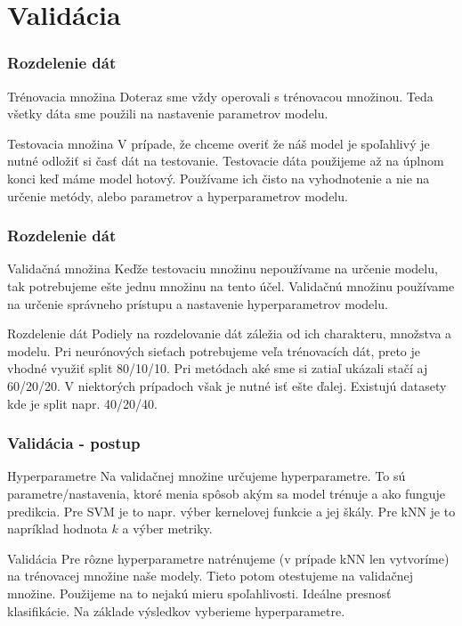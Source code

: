 \documentclass{beamer}
\begin{document}
\section{Validácia}
\begin{frame}
\frametitle{Rozdelenie dát}
\begin{block}{Trénovacia množina}
Doteraz sme vždy operovali s trénovacou množinou. Teda všetky dáta sme použili na nastavenie parametrov modelu.
\end{block}

\begin{block}{Testovacia množina}
V prípade, že chceme overiť že náš model je spoľahlivý je nutné odložiť si časť dát na testovanie. Testovacie dáta použijeme až na úplnom konci keď máme model hotový. Používame ich čisto na vyhodnotenie a nie na určenie metódy, alebo parametrov a hyperparametrov modelu.
\end{block}
\end{frame}


\begin{frame}
\frametitle{Rozdelenie dát}
\begin{block}{Validačná množina}
Keďže testovaciu množinu nepoužívame na určenie modelu, tak potrebujeme ešte jednu množinu na tento účel. Validačnú množinu používame na určenie správneho prístupu a nastavenie hyperparametrov modelu. 
\end{block}

\begin{block}{Rozdelenie dát}
Podiely na rozdelovanie dát záležia od ich charakteru, množstva a modelu. Pri neurónových sieťach potrebujeme veľa trénovacích dát, preto je vhodné využiť split 80/10/10. Pri metódach aké sme si zatiaľ ukázali stačí aj 60/20/20. V niektorých prípadoch však je nutné isť ešte ďalej. Existujú datasety kde je split napr. 40/20/40.
\end{block}
\end{frame}


\begin{frame}
\frametitle{Validácia - postup}
\begin{block}{Hyperparametre}
Na validačnej množine určujeme hyperparametre. To sú parametre/nastavenia, ktoré menia spôsob akým sa model trénuje a ako funguje predikcia. Pre SVM je to napr. výber kernelovej funkcie a jej škály. Pre kNN je to napríklad hodnota $k$ a výber metriky. 
\end{block}

\begin{block}{Validácia}
Pre rôzne hyperparametre natrénujeme (v prípade kNN len vytvoríme) na trénovacej množine naše modely. Tieto potom otestujeme na validačnej množine.  Použijeme na to nejakú mieru spoľahlivosti. Ideálne presnosť klasifikácie. Na základe výsledkov vyberieme hyperparametre.
\end{block}
\end{frame}
\end{document}
